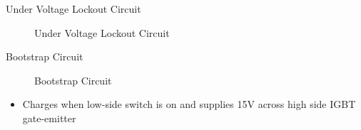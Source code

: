 
\begin{frame}{Under Voltage Lockout Circuit}
	\begin{figure}
		\centering


		\caption{Under Voltage Lockout Circuit}
	\end{figure}
\end{frame}


\begin{frame}{Bootstrap Circuit}
	\begin{figure}
		\centering


		\caption{Bootstrap Circuit}
	\end{figure}

	\begin{itemize}
		\item Charges when low-side switch is on and supplies 15V across high side IGBT gate-emitter
	\end{itemize}
\end{frame}



